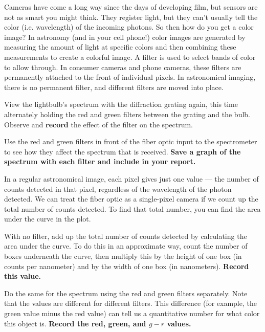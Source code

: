 Cameras have come a long way since the days of developing film, but sensors are not as smart you might think. They register light, but they can't usually tell the color (i.e. wavelength) of the incoming photons. So then how do you get a color image? In astronomy (and in your cell phone!) color images are generated by measuring the amount of light at specific colors and then combining these measurements to create a colorful image. A filter is used to select bands of color to allow through. In consumer cameras and phone cameras, these filters are permanently attached to the front of individual pixels. In astronomical imaging, there is no permanent filter, and different filters are moved into place.

\begin{steps}
	\item View the lightbulb's spectrum with the diffraction grating again, this time alternately holding the red and green filters between the grating and the bulb. Observe and \textbf{record} the effect of the filter on the spectrum.
	
	\item Use the red and green filters in front of the fiber optic input to the spectrometer to see how they affect the spectrum that is received. \textbf{Save a graph of the spectrum with each filter and include in your report.}
\end{steps}

In a regular astronomical image, each pixel gives just one value --- the number of counts detected in that pixel, regardless of the wavelength of the photon detected. We can treat the fiber optic as a single-pixel camera if we count up the total number of counts detected. To find that total number, you can find the area under the curve in the plot.

\begin{steps}
	\item With no filter, add up the total number of counts detected by calculating the area under the curve. To do this in an approximate way, count the number of boxes underneath the curve, then multiply this by the height of one box (in counts per nanometer) and by the width of one box (in nanometers). \textbf{Record this value.}
	
	\item Do the same for the spectrum using the red and green filters separately. Note that the values are different for different filters. This difference (for example, the green value minus the red value) can tell us a quantitative number for what color this object is. \textbf{Record the red, green, and $g-r$ values.}
\end{steps}

